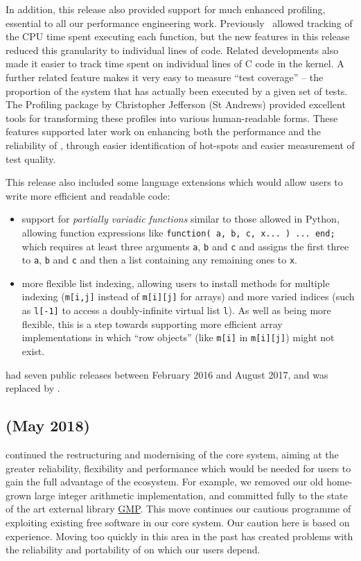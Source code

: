 \documentclass{deliverablereport}
\begin{document}
In addition, this release also provided support for much enhanced
profiling, essential to all our performance engineering work.
Previously \GAP\ allowed tracking of the CPU time spent
executing each function, but the new features in this release
reduced this granularity to individual lines of \GAP
code. Related developments also made it easier to track time spent on
individual lines of C code in the \GAP kernel. A further related
feature makes it very easy to measure ``test coverage'' -- the
proportion of the system that has actually been executed by a given
set of tests. The {\sf Profiling} package \cite{profiling} by Christopher Jefferson (St
Andrews) provided excellent tools for transforming these profiles into
various human-readable forms. These features supported later work on
enhancing both the performance and the reliability of \GAP, through
easier identification of hot-spots and easier measurement of test
quality.

This release also included some language extensions which would allow
users to write more efficient and readable code:

\begin{itemize}
  \item support for \emph{partially
  variadic functions} similar to those allowed in Python, allowing
function expressions like
\verb|function( a, b, c, x... ) ... end;|
which requires at least three arguments \verb|a|, \verb|b| and
\verb|c| and assigns the first three to \verb|a|, \verb|b| and \verb|c|
and then a list containing any remaining ones to \verb|x|.
\item more flexible list indexing, allowing users to install methods
  for multiple indexing (\verb|m[i,j]| instead of \verb|m[i][j]| for
  arrays) and more varied indices (such as \verb|l[-1]| to access a
  doubly-infinite virtual list \verb|l|). As well as being more
  flexible, this is a step towards supporting more efficient array
  implementations in which ``row objects'' (like \verb|m[i]| in
  \verb|m[i][j]|) might not exist.
\end{itemize}

 had seven public releases between February 2016 and August 2017, and
was replaced by .

\subsection{ (May 2018)}\label{gap-4.9}

 continued the restructuring and modernising of the core \GAP
system, aiming at the greater reliability, flexibility and performance
which would be needed for \GAP users to gain the full advantage of the \ODK ecosystem.
For example, we removed our old home-grown large integer arithmetic
implementation, and committed fully to the state of the art external
library \href{???}{GMP}. This
move continues our cautious programme of exploiting existing free
software in our core system. Our caution here is based on
experience. Moving too quickly in this area in the past has created
problems with the reliability and
portability of \GAP on which our users depend.
\end{document}
